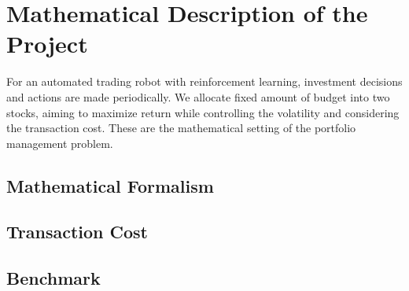 \chapter{Mathematical Description of the Project}
\label{Ch:mathematical description}
For an automated trading robot with reinforcement learning, investment decisions and actions are made periodically. We allocate fixed amount of budget into two stocks, aiming to maximize return while controlling the volatility and considering the transaction cost. These are the mathematical setting of the portfolio management problem.

\section{Mathematical Formalism}

\section{Transaction Cost}

\section{Benchmark}
